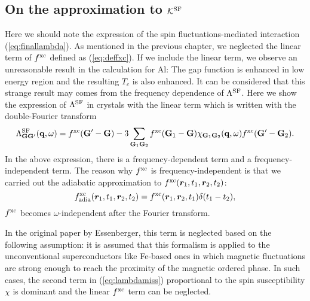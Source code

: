 \subsection{On the approximation to $\mathcal K^{\rm SF}$}
Here we should note the expression of the spin fluctuations-mediated interaction (\ref{eq:finallambda}).
As mentioned in the previous chapter, we neglected the linear term of $f^{\rm xc}$ defined as 
(\ref{eq:deffxc}). If we include the linear term, we observe an unreasonable result in the
calculation for Al: The gap function is enhanced in low energy region and the resulting $T_c$
is also enhanced. It can be considered that this strange result may comes from the frequency
dependence of $\Lambda^{\rm SF}$. Here we show the expression of $\Lambda^{\rm SF}$ in crystals with 
the linear term which is written with the double-Fourier transform\cite{Hybertsen1987}
%
\begin{equation}
	\Lambda^{\rm SF}_{\mathbf G \mathbf G'}(\mathbf q, \omega) = f^{\rm xc}(\mathbf G' - \mathbf G) - 
	3\sum_{\mathbf G_1 \mathbf G_2} f^{\rm xc}(\mathbf G_1 - \mathbf G)\chi_{\mathbf G_1 \mathbf G_2}(\mathbf q, \omega)
	f^{\rm xc}(\mathbf G' - \mathbf G_2).
	\label{eq:lambdamiss}
\end{equation}
%
In the above expression, there is a frequency-dependent term and a frequency-independent term.
The reason why $f^{\rm xc}$ is frequency-independent is that we carried out 
the adiabatic approximation to $f^{\rm xc}(\bm r_1,t_1, \bm r_2,t_2)$:
%
\begin{equation}
	f^{\rm xc}_{\rm adia}(\bm r_1,t_1, \bm r_2, t_2) = f^{\rm xc}(\bm r_1,\bm r_2, t_1)\delta(t_1 - t_2),
	\label{eq:adiabatic}
\end{equation}
%
$f^{\rm xc}$ becomes $\omega$-independent after the Fourier transform.

In the original paper by Essenberger\cite{Essenberger2014}, this term is neglected based on the following assumption:
it is assumed that this formalism is applied to the unconventional superconductors like Fe-based ones
in which magnetic fluctuations are strong enough to reach the proximity of the magnetic ordered phase.
In such cases, the second term in (\ref{eq:lambdamiss}) proportional to the spin 
susceptibility $\chi$ is dominant and the linear $f^{\rm xc}$ term can be neglected.

